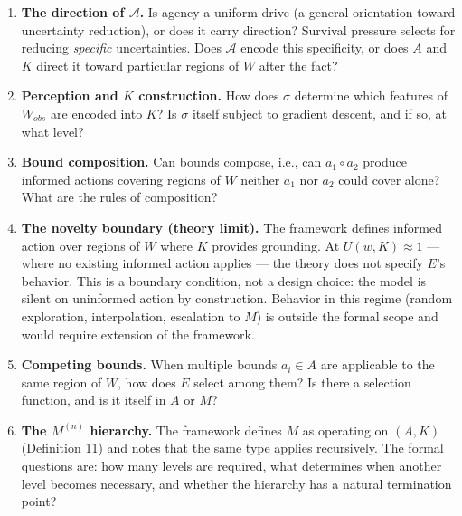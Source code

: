 \documentclass[
]{article}
\begin{document}
\begin{enumerate}
  Formal derivation of this claim from thermodynamic first principles
  (connecting \(U_{lethal}^d\) to physical entropy thresholds and
  demonstrating the inevitability of primitive \(\mathcal{A}\) from
  dissipative system dynamics) remains open. See {[}Prigogine1984{]}
  (dissipative structures), {[}England2013{]} (dissipative adaptation),
  and {[}Schrodinger1944{]} (negative entropy and life) for adjacent
  physical frameworks.
\item
  \textbf{The direction of \(\mathcal{A}\).} Is agency a uniform drive
  (a general orientation toward uncertainty reduction), or does it carry
  direction? Survival pressure selects for reducing \emph{specific}
  uncertainties. Does \(\mathcal{A}\) encode this specificity, or does
  \(A\) and \(K\) direct it toward particular regions of \(W\) after the
  fact?
\item
  \textbf{Perception and \(K\) construction.} How does \(\sigma\)
  determine which features of \(W_{obs}\) are encoded into \(K\)? Is
  \(\sigma\) itself subject to gradient descent, and if so, at what
  level?
\item
  \textbf{Bound composition.} Can bounds compose, i.e., can
  \(a_1 \circ a_2\) produce informed actions covering regions of \(W\)
  neither \(a_1\) nor \(a_2\) could cover alone? What are the rules of
  composition?
\item
  \textbf{The novelty boundary (theory limit).} The framework defines
  informed action over regions of \(W\) where \(K\) provides grounding.
  At \(U(w, K) \approx 1\) --- where no existing informed action applies
  --- the theory does not specify \(E\)'s behavior. This is a boundary
  condition, not a design choice: the model is silent on uninformed
  action by construction. Behavior in this regime (random exploration,
  interpolation, escalation to \(M\)) is outside the formal scope and
  would require extension of the framework.
\item
  \textbf{Competing bounds.} When multiple bounds \(a_i \in A\) are
  applicable to the same region of \(W\), how does \(E\) select among
  them? Is there a selection function, and is it itself in \(A\) or
  \(M\)?
\item
  \textbf{The \(M^{(n)}\) hierarchy.} The framework defines \(M\) as
  operating on \((A, K)\) (Definition 11) and notes that the same type
  applies recursively. The formal questions are: how many levels are
  required, what determines when another level becomes necessary, and
  whether the hierarchy has a natural termination point?


\end{enumerate}
\end{document}
